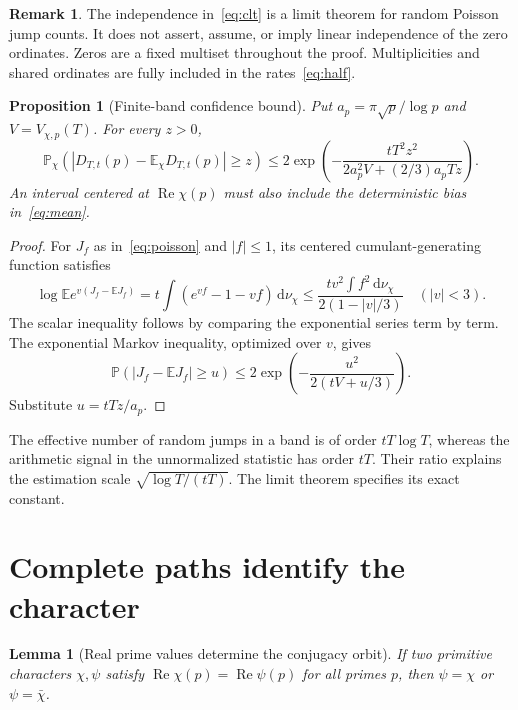 \documentclass[11pt]{article}
\newtheorem{proposition}[theorem]{Proposition}
\newtheorem{lemma}[theorem]{Lemma}
\theoremstyle{definition}
\newtheorem{remark}[theorem]{Remark}
\newcommand{\E}{\mathbb E}
\newcommand{\Prob}{\mathbb P}
\newcommand{\Rea}{\operatorname{Re}}
\newcommand{\dd}{\,\mathrm d}
\newcommand{\abs}[1]{\left|#1\right|}
\begin{document}
\begin{remark}
The independence in~\eqref{eq:clt} is a limit theorem for random Poisson jump
counts. It does not assert, assume, or imply linear independence of the zero
ordinates. Zeros are a fixed multiset throughout the proof. Multiplicities and
shared ordinates are fully included in the rates~\eqref{eq:half}.
\end{remark}

\begin{proposition}[Finite-band confidence bound]\label{prop:confidence}
Put $a_p=\pi\sqrt p/\log p$ and $V=V_{\chi,p}(T)$. For every $z>0$,
\begin{equation}\label{eq:confidence}
 \Prob_\chi\!\left(\abs{D_{T,t}(p)-\E_\chi D_{T,t}(p)}\ge z\right)
 \le2\exp\left(-\frac{tT^2z^2}
                         {2a_p^2V+(2/3)a_pTz}\right).
\end{equation}
An interval centered at $\Rea\chi(p)$ must also include the deterministic bias
in~\eqref{eq:mean}.
\end{proposition}

\begin{proof}
For $J_f$ as in~\eqref{eq:poisson} and $\abs f\le1$, its centered
cumulant-generating function satisfies
\[
 \log\E e^{v(J_f-\E J_f)}
  =t\int(e^{vf}-1-vf)\dd\nu_\chi
  \le\frac{tv^2\int f^2\dd\nu_\chi}{2(1-\abs v/3)}
 \quad(\abs v<3).
\]
The scalar inequality follows by comparing the exponential series term by
term. The exponential Markov inequality, optimized over $v$, gives
\[
 \Prob(\abs{J_f-\E J_f}\ge u)
       \le2\exp\left(-\frac{u^2}{2(tV+u/3)}\right).
\]
Substitute $u=tTz/a_p$.
\end{proof}

The effective number of random jumps in a band is of order $tT\log T$, whereas
the arithmetic signal in the unnormalized statistic has order $tT$.
Their ratio explains the estimation scale
$\sqrt{\log T/(tT)}$. The limit theorem specifies its exact constant.

\section{Complete paths identify the character}
\label{sec:path}

\begin{lemma}[Real prime values determine the conjugacy orbit]\label{lem:character}
If two primitive characters $\chi,\psi$ satisfy
$\Rea\chi(p)=\Rea\psi(p)$ for all primes $p$, then
$\psi=\chi$ or $\psi=\bar\chi$.
\end{lemma}
\end{document}
